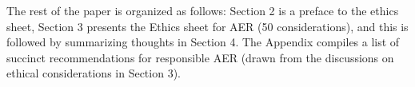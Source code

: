 \documentclass{clv3}
\begin{document}
The rest of the paper is organized as follows: Section 2 is a preface to the ethics sheet, Section 3 presents the Ethics sheet for AER (50 considerations), and this is followed by summarizing thoughts in Section 4. 
The Appendix compiles a list of succinct recommendations for responsible AER (drawn from the discussions on ethical considerations in Section 3).



\end{document}

